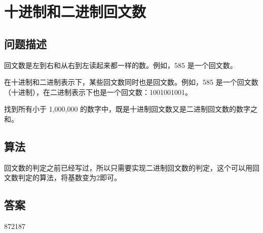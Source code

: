 \section{十进制和二进制回文数}
\subsection{问题描述}
\begin{tcolorbox}

回文数是左到右和从右到左读起来都一样的数。例如，585 是一个回文数。

在十进制和二进制表示下，某些回文数同时也是回文数。例如，585 是一个回文数（十进制），在二进制表示下也是一个回文数：1001001001。

找到所有小于 1,000,000 的数字中，既是十进制回文数又是二进制回文数的数字之和。
\end{tcolorbox}

\subsection{算法}
回文数的判定之前已经写过，所以只需要实现二进制回文数的判定，这个可以用回文数判定的算法，将基数变为2即可。


\subsection{答案}
872187
